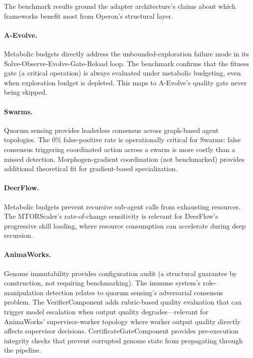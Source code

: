 \documentclass[11pt]{article}
\begin{document}
The benchmark results ground the adapter architecture's claims about
which frameworks benefit most from Operon's structural layer.

\paragraph{A-Evolve.}
Metabolic budgets directly address the unbounded-exploration failure
mode in its Solve-Observe-Evolve-Gate-Reload loop.  The benchmark
confirms that the fitness gate (a critical operation) is always
evaluated under metabolic budgeting, even when exploration budget is
depleted.  This maps to A-Evolve's quality gate never being skipped.

\paragraph{Swarms.}
Quorum sensing provides leaderless consensus across graph-based agent
topologies.  The 0\% false-positive rate is operationally critical
for Swarms: false consensus triggering coordinated action across a
swarm is more costly than a missed detection.  Morphogen-gradient
coordination (not benchmarked) provides additional theoretical
fit for gradient-based specialization.

\paragraph{DeerFlow.}
Metabolic budgets prevent recursive sub-agent calls from exhausting
resources.  The MTORScaler's rate-of-change sensitivity is relevant
for DeerFlow's progressive skill loading, where resource consumption
can accelerate during deep recursion.

\paragraph{AnimaWorks.}
Genome immutability provides configuration audit (a structural
guarantee by construction, not requiring benchmarking).  The immune
system's role-manipulation detection relates to quorum sensing's
adversarial consensus problem.  The VerifierComponent adds rubric-based
quality evaluation that can trigger model escalation when output quality
degrades---relevant for AnimaWorks' supervisor-worker topology where
worker output quality directly affects supervisor decisions.
CertificateGateComponent provides pre-execution integrity checks that
prevent corrupted genome state from propagating through the pipeline.
\end{document}
